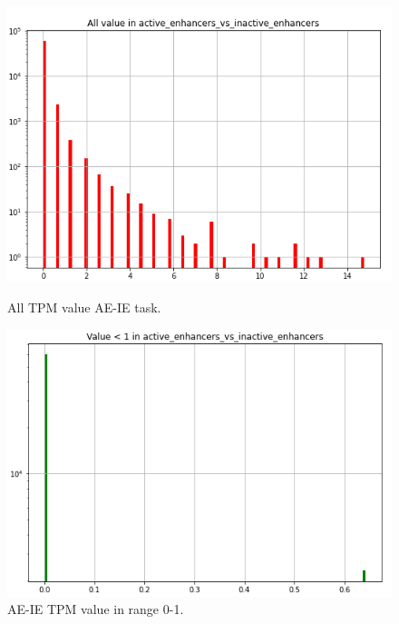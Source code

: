 \documentclass{article}
\begin{document}
\begin{figure}[!ht]
    \begin{center}
        \begin{minipage}[t]{.8\textwidth}
            \centering
            \includegraphics[width=\textwidth]{image/All_ae_vs_ie.PNG}
            \caption{All TPM value \acrshort{AE-IE} task.}
            \label{fig:All_ae_vs_ie}
        \end{minipage}
        \begin{minipage}[t]{.8\textwidth}
            \centering
            \includegraphics[width=\textwidth]{image/Restrict_ae_vs_ie.PNG}
            \caption{\acrshort{AE-IE} TPM value in range 0-1.}
            \label{fig:Restrict_ae_vs_ie}
        \end{minipage}
    \end{center}
\end{figure}
\end{document}
